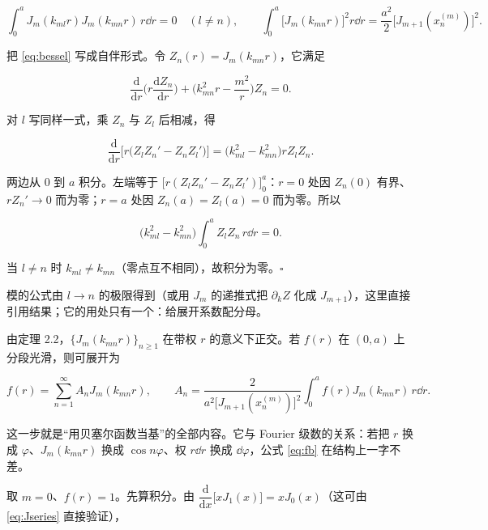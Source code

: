 

\[
\int_0^aJ_m(k_{ml}r)J_m(k_{mn}r)\,r\dd r=0\quad(l\ne n),
\qquad
\int_0^a\big[J_m(k_{mn}r)\big]^2r\dd r=\frac{a^2}{2}\big[J_{m+1}(x_n^{(m)})\big]^2 .
\]

\pfline

把 \eqref{eq:bessel} 写成自伴形式。令 $Z_n(r)=J_m(k_{mn}r)$，它满足

\[
\frac{\mathrm d}{\mathrm dr}\Big(r\frac{\mathrm dZ_n}{\mathrm dr}\Big)+\Big(k_{mn}^2r-\frac{m^2}{r}\Big)Z_n=0 .
\]

对 $l$ 写同样一式，乘 $Z_n$ 与 $Z_l$ 后相减，得

\[
\frac{\mathrm d}{\mathrm dr}\Big[r\Big(Z_lZ_n'-Z_nZ_l'\Big)\Big]=\big(k_{ml}^2-k_{mn}^2\big)rZ_lZ_n .
\]

两边从 $0$ 到 $a$ 积分。左端等于 $\big[r(Z_lZ_n'-Z_nZ_l')\big]_0^a$：$r=0$ 处因 $Z_n(0)$ 有界、$rZ_n'\to0$ 而为零；$r=a$ 处因 $Z_n(a)=Z_l(a)=0$ 而为零。所以

\[
\big(k_{ml}^2-k_{mn}^2\big)\int_0^aZ_lZ_n\,r\dd r=0 .
\]

当 $l\ne n$ 时 $k_{ml}\ne k_{mn}$（零点互不相同），故积分为零。$\square$

模的公式由 $l\to n$ 的极限得到（或用 $J_m$ 的递推式把 $\partial_kZ$ 化成 $J_{m+1}$），这里直接引用结果；它的用处只有一个：给展开系数配分母。


由定理 2.2，$\{J_m(k_{mn}r)\}_{n\ge1}$ 在带权 $r$ 的意义下正交。若 $f(r)$ 在 $(0,a)$ 上分段光滑，则可展开为

\begin{equation}
f(r)=\sum_{n=1}^{\infty}A_nJ_m(k_{mn}r),\qquad
A_n=\frac{2}{a^2\big[J_{m+1}(x_n^{(m)})\big]^2}\int_0^af(r)J_m(k_{mn}r)\,r\dd r .
\label{eq:fb}
\end{equation}

这一步就是“用贝塞尔函数当基”的全部内容。它与 Fourier 级数的关系：若把 $r$ 换成 $\varphi$、$J_m(k_{mn}r)$ 换成 $\cos n\varphi$、权 $r\dd r$ 换成 $\dd\varphi$，公式 \eqref{eq:fb} 在结构上一字不差。


取 $m=0$、$f(r)=1$。先算积分。由 $\dfrac{\mathrm d}{\mathrm dx}\big[xJ_1(x)\big]=xJ_0(x)$（这可由 \eqref{eq:Jseries} 直接验证），

